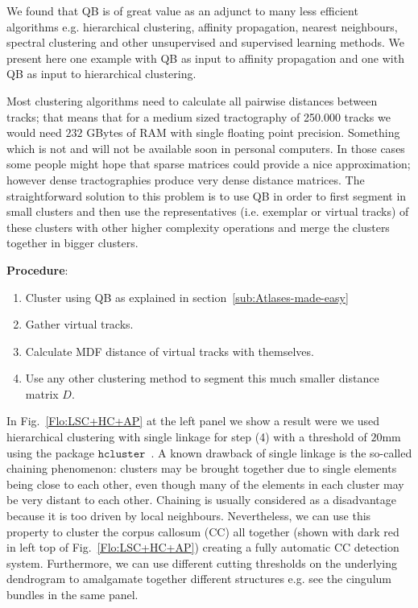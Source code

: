\documentclass[preprint,authoryear,a4paper,10pt,onecolumn]{elsarticle}
\begin{document}
We found that QB is of great value as an adjunct to many less efficient
algorithms e.g. hierarchical clustering, affinity propagation, nearest
neighbours, spectral clustering and other unsupervised and supervised
learning methods. We present here one example with QB as input to
affinity propagation and one with QB as input to hierarchical
clustering.

Most clustering algorithms need to calculate all pairwise distances
between tracks; that means that for a medium sized tractography of
\num{250,000} tracks we would need $232$ GBytes of RAM with single floating
point precision. Something which is not and will not be available soon
in personal computers. In those cases some people might hope that sparse
matrices could provide a nice approximation; however dense
tractographies produce very dense distance matrices. The straightforward
solution to this problem is to use QB in order to first segment in small
clusters and then use the representatives (i.e. exemplar or virtual
tracks) of these clusters with other higher complexity operations and
merge the clusters together in bigger clusters.

\textbf{Procedure}:

\begin{enumerate}

\item Cluster using QB as explained in section~\ref{sub:Atlases-made-easy}

\item Gather virtual tracks.

\item Calculate MDF distance of virtual tracks with themselves.

\item Use any other clustering method to segment this much smaller distance
matrix $D$.

\end{enumerate}

In Fig.~\ref{Flo:LSC+HC+AP} at the left panel we show a result were we
used hierarchical clustering with single linkage for step (4) with a
threshold of $20$mm using the package
$\texttt{hcluster}$~\citep{eads-hcluster-software}. A known drawback of
single linkage is the so-called chaining phenomenon: clusters may be
brought together due to single elements being close to each other, even
though many of the elements in each cluster may be very distant to each
other.  Chaining is usually considered as a disadvantage because it is
too driven by local neighbours. Nevertheless, we can use this property
to cluster the corpus callosum (CC) all together (shown with dark red in
left top of Fig.~\ref{Flo:LSC+HC+AP}) creating a fully automatic CC
detection system.  Furthermore, we can use different cutting thresholds
on the underlying dendrogram to amalgamate together different structures
e.g. see the cingulum bundles in the same panel.
\end{document}
